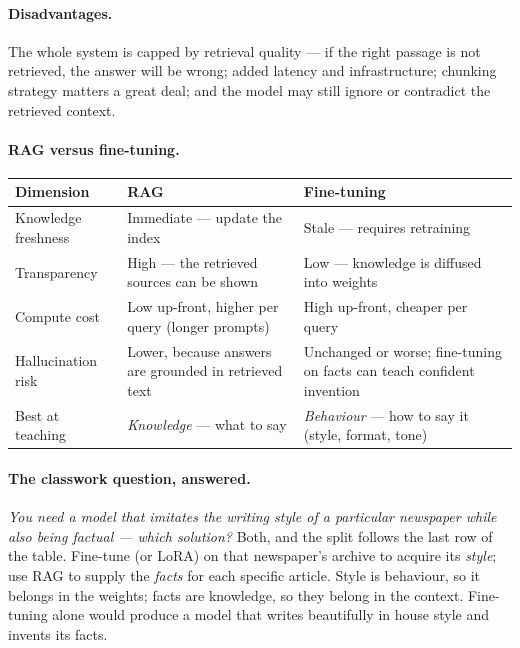 \documentclass[11pt,a4paper]{article}
\begin{document}
\paragraph{Disadvantages.} The whole system is capped by retrieval quality --- if the right
passage is not retrieved, the answer will be wrong; added latency and infrastructure;
chunking strategy matters a great deal; and the model may still ignore or contradict the
retrieved context.

\paragraph{RAG versus fine-tuning.}
\begin{center}
\begin{tabularx}{\textwidth}{lYY}
\textbf{Dimension} & \textbf{RAG} & \textbf{Fine-tuning} \\
\hline
Knowledge freshness & Immediate --- update the index & Stale --- requires retraining \\
Transparency & High --- the retrieved sources can be shown & Low --- knowledge is diffused
into weights \\
Compute cost & Low up-front, higher per query (longer prompts) & High up-front, cheaper per
query \\
Hallucination risk & Lower, because answers are grounded in retrieved text & Unchanged or
worse; fine-tuning on facts can teach confident invention \\
Best at teaching & \emph{Knowledge} --- what to say & \emph{Behaviour} --- how to say it
(style, format, tone) \\
\end{tabularx}
\end{center}

\paragraph{The classwork question, answered.} \emph{You need a model that imitates the writing
style of a particular newspaper while also being factual --- which solution?} Both, and the
split follows the last row of the table. Fine-tune (or LoRA) on that newspaper's archive to
acquire its \emph{style}; use RAG to supply the \emph{facts} for each specific article. Style
is behaviour, so it belongs in the weights; facts are knowledge, so they belong in the context.
Fine-tuning alone would produce a model that writes beautifully in house style and invents its
facts.
\end{document}
